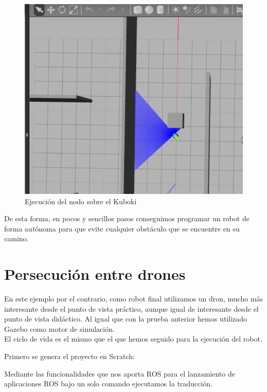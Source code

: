 \begin{figure}[H]
    \centering
    \includegraphics[scale=0.75]{img/robot-example.PNG}
  	\caption{Ejecución del nodo sobre el Kuboki}
  	\label{fig:curiosity}
\end{figure}


De esta forma, en pocos y sencillos pasos conseguimos programar un robot de forma autónoma para que evite cualquier obstáculo que se encuentre en su camino.


\section{Persecución entre drones}
\label{sec:persecucion-drones}

En este ejemplo por el contrario, como robot final utilizamos un dron, mucho más interesante desde el punto de vista práctico, aunque igual de interesante desde el punto de vista didáctico. Al igual que con la prueba anterior hemos utilizado Gazebo como motor de simulación.\\

El ciclo de vida es el mismo que el que hemos seguido para la ejecución del robot.

Primero se genera el proyecto en Scratch:



Mediante las funcionalidades que nos aporta ROS para el lanzamiento de aplicaciones ROS bajo un solo comando ejecutamos la traducción.